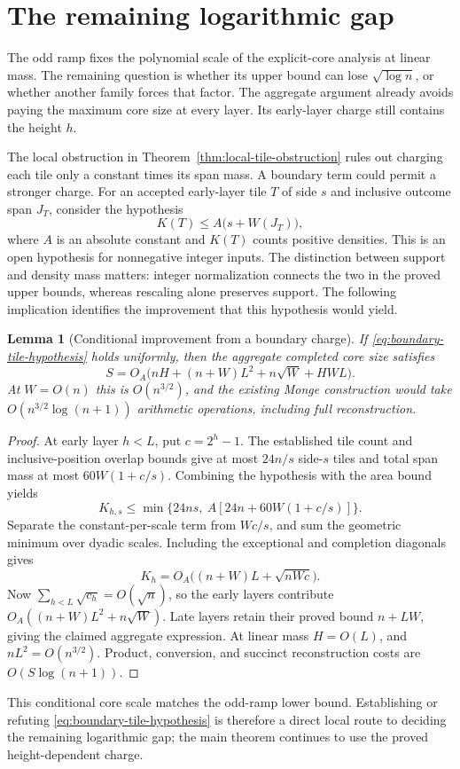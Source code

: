 \documentclass[11pt]{article}
\newtheorem{lemma}[theorem]{Lemma}
\begin{document}
\section{The remaining logarithmic gap}\label{sec:questions}
The odd ramp fixes the polynomial scale of the explicit-core analysis at
linear mass. The remaining question is whether its upper bound can lose
$\sqrt{\log n}$, or whether another family forces that factor.
The aggregate argument already avoids paying the maximum core size at
every layer. Its early-layer charge still contains the height $h$.

The local obstruction in Theorem~\ref{thm:local-tile-obstruction} rules out
charging each tile only a constant times its span mass. A boundary term
could permit a stronger charge. For an accepted early-layer tile $T$ of
side $s$ and inclusive outcome span $J_T$, consider the hypothesis
\begin{equation}\label{eq:boundary-tile-hypothesis}
 K(T)\le A\bigl(s+W(J_T)\bigr),
\end{equation}
where $A$ is an absolute constant and $K(T)$ counts positive densities.
This is an open hypothesis for nonnegative integer inputs. The distinction
between support and density mass matters: integer normalization connects
the two in the proved upper bounds, whereas rescaling alone preserves support.
The following implication identifies the improvement that this hypothesis
would yield.

\begin{lemma}[Conditional improvement from a boundary charge]
\label{lem:boundary-tile-conditional}
If \eqref{eq:boundary-tile-hypothesis} holds uniformly, then the aggregate
completed core size satisfies
\[
 S=O_A\bigl(nH+(n+W)L^2+n\sqrt W+HWL\bigr).
\]
At $W=O(n)$ this is $O(n^{3/2})$, and the existing Monge construction
would take $O(n^{3/2}\log(n+1))$ arithmetic operations, including full
reconstruction.
\end{lemma}
\begin{proof}
At early layer $h<L$, put $c=2^h-1$. The established tile count and
inclusive-position overlap bounds give at most $24n/s$ side-$s$ tiles
and total span mass at most $60W(1+c/s)$. Combining the hypothesis with
the area bound yields
\[
 K_{h,s}\le\min\{24ns,\ A[24n+60W(1+c/s)]\}.
\]
Separate the constant-per-scale term from $Wc/s$, and sum the geometric
minimum over dyadic scales. Including the exceptional and completion
diagonals gives
\[
 K_h=O_A\bigl((n+W)L+\sqrt{nWc}\bigr).
\]
Now $\sum_{h<L}\sqrt{c_h}=O(\sqrt n)$, so the early layers contribute
$O_A((n+W)L^2+n\sqrt W)$. Late layers retain their proved bound $n+LW$,
giving the claimed aggregate expression. At linear mass $H=O(L)$, and
$nL^2=O(n^{3/2})$. Product, conversion, and succinct reconstruction costs
are $O(S\log(n+1))$.
\end{proof}
This conditional core scale matches the odd-ramp lower bound. Establishing
or refuting \eqref{eq:boundary-tile-hypothesis} is therefore a direct
local route to deciding the remaining logarithmic gap; the main theorem
continues to use the proved height-dependent charge.
\end{document}

